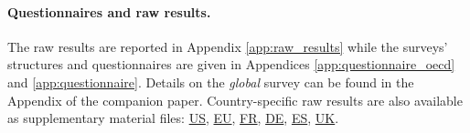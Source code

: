 \begin{bibunit}
\begin{small}
\paragraph{\small Questionnaires and raw results.} %
The raw results are reported in Appendix \ref{app:raw_results} while the surveys' structures and questionnaires are given in Appendices \ref{app:questionnaire_oecd} and \ref{app:questionnaire}. Details on the \textit{global} survey can be found in the Appendix of the companion paper.\citep{dechezlepretre_fighting_nodate} Country-specific raw results are also available as supplementary material files:  \href{https://github.com/bixiou/international_attitudes_toward_global_policies/raw/main/paper/app_desc_stats_US.pdf}{US}, \href{https://github.com/bixiou/international_attitudes_toward_global_policies/raw/main/paper/app_desc_stats_EU.pdf}{EU}, \href{https://github.com/bixiou/international_attitudes_toward_global_policies/raw/main/paper/app_desc_stats_FR.pdf}{FR}, \href{https://github.com/bixiou/international_attitudes_toward_global_policies/raw/main/paper/app_desc_stats_DE.pdf}{DE}, \href{https://github.com/bixiou/international_attitudes_toward_global_policies/raw/main/paper/app_desc_stats_ES.pdf}{ES}, \href{https://github.com/bixiou/international_attitudes_toward_global_policies/raw/main/paper/app_desc_stats_UK.pdf}{UK}. %



\end{small}
\end{bibunit}
